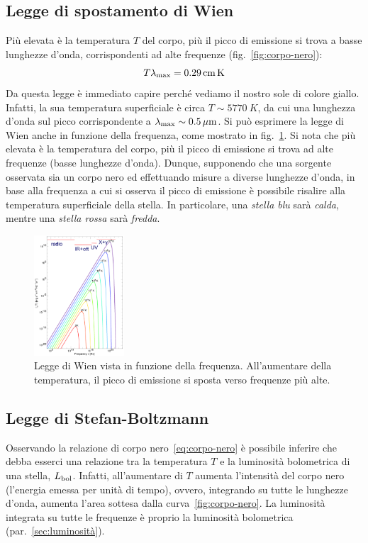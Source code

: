 \subsection{Legge di spostamento di Wien}\label{sec:legge-wien}
Più elevata è la temperatura $T$ del corpo, più il picco di emissione si trova a basse lunghezze d'onda, corrispondenti ad alte frequenze (fig.~\ref{fig:corpo-nero}):
\begin{equation}\label{eq:legge-wien}
    T \lambda_\textup{max} = \SI{0.29}{cm.K}
\end{equation}
Da questa legge è immediato capire perché vediamo il nostro sole di colore giallo. Infatti, la sua temperatura superficiale è circa $T \sim \SI{5770}{K}$, da cui una lunghezza d'onda sul picco corrispondente a $\lambda_\textup{max} \sim \SI{0.5}{\mu m}$. Si può esprimere la legge di Wien anche in funzione della frequenza, come mostrato in fig.~\ref{fig:legge-wien}. Si nota che più elevata è la temperatura del corpo, più il picco di emissione si trova ad alte frequenze (basse lunghezze d'onda). Dunque, supponendo che una sorgente osservata sia un corpo nero ed effettuando misure a diverse lunghezze d'onda, in base alla frequenza a cui si osserva il picco di emissione è possibile risalire alla temperatura superficiale della stella. In particolare, una \emph{stella blu} sarà \emph{calda}, mentre una \emph{stella rossa} sarà \emph{fredda}.

\begin{figure}
\centering
\includegraphics[width=0.3\textwidth]{immagini/legge-wien.png}
\caption{Legge di Wien vista in funzione della frequenza. All'aumentare della temperatura, il picco di emissione si sposta verso frequenze più alte.}
\label{fig:legge-wien}
\end{figure}

\subsection{Legge di Stefan-Boltzmann}\label{sec:legge-stefan-boltzmann}
Osservando la relazione di corpo nero~\eqref{eq:corpo-nero} è possibile inferire che debba esserci una relazione tra la temperatura $T$ e la luminosità bolometrica di una stella, $L_\textup{bol}$. Infatti, all'aumentare di $T$ aumenta l'intensità del corpo nero (l'energia emessa per unità di tempo), ovvero, integrando su tutte le lunghezze d'onda, aumenta l'area sottesa dalla curva~\ref{fig:corpo-nero}. La luminosità integrata su tutte le frequenze è proprio la luminosità bolometrica (par.~\ref{sec:luminosità}).


